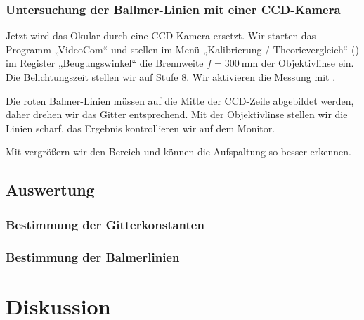 \FloatBarrier
\subsubsection{Untersuchung der Ballmer-Linien mit einer CCD-Kamera}

Jetzt wird das Okular durch eine CCD-Kamera ersetzt. Wir starten das Programm
„VideoCom“ und stellen im Menü „Kalibrierung / Theorievergleich“
() im Register „Beugungswinkel“ die Brennweite $f =
\SI{300}{\milli\meter}$ der Objektivlinse ein. Die Belichtungszeit stellen wir
auf Stufe 8. Wir aktivieren die Messung mit .

Die roten Balmer-Linien müssen auf die Mitte der CCD-Zeile abgebildet werden,
daher drehen wir das Gitter entsprechend. Mit der Objektivlinse stellen wir die
Linien scharf, das Ergebnis kontrollieren wir auf dem Monitor.

Mit \Alt{} vergrößern wir den Bereich und können die Aufspaltung so
besser erkennen.

\FloatBarrier
\subsection{Auswertung}

\FloatBarrier
\subsubsection{Bestimmung der Gitterkonstanten}

\FloatBarrier
\subsubsection{Bestimmung der Balmerlinien}


\FloatBarrier
\section{Diskussion}


